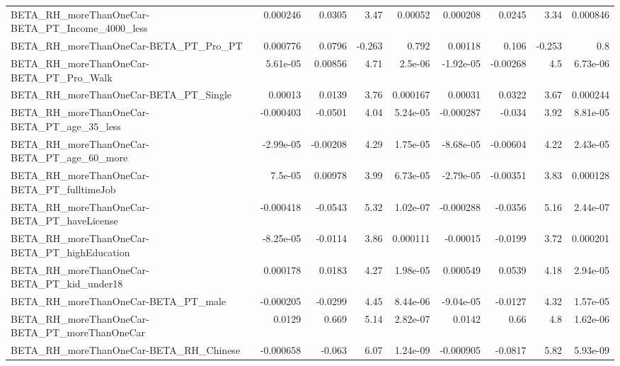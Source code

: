\begin{tabular}{lrrrrrrrr}
BETA\_RH\_moreThanOneCar-BETA\_PT\_Income\_4000\_less    &    0.000246 &       0.0305 &      3.47 &  0.00052 &   0.000208 &      0.0245 &         3.34 &      0.000846 \\
BETA\_RH\_moreThanOneCar-BETA\_PT\_Pro\_PT              &    0.000776 &       0.0796 &    -0.263 &    0.792 &    0.00118 &       0.106 &       -0.253 &           0.8 \\
BETA\_RH\_moreThanOneCar-BETA\_PT\_Pro\_Walk            &    5.61e-05 &      0.00856 &      4.71 &  2.5e-06 &  -1.92e-05 &    -0.00268 &          4.5 &      6.73e-06 \\
BETA\_RH\_moreThanOneCar-BETA\_PT\_Single              &     0.00013 &       0.0139 &      3.76 & 0.000167 &    0.00031 &      0.0322 &         3.67 &      0.000244 \\
BETA\_RH\_moreThanOneCar-BETA\_PT\_age\_35\_less         &   -0.000403 &      -0.0501 &      4.04 & 5.24e-05 &  -0.000287 &      -0.034 &         3.92 &      8.81e-05 \\
BETA\_RH\_moreThanOneCar-BETA\_PT\_age\_60\_more         &   -2.99e-05 &     -0.00208 &      4.29 & 1.75e-05 &  -8.68e-05 &    -0.00604 &         4.22 &      2.43e-05 \\
BETA\_RH\_moreThanOneCar-BETA\_PT\_fulltimeJob         &     7.5e-05 &      0.00978 &      3.99 & 6.73e-05 &  -2.79e-05 &    -0.00351 &         3.83 &      0.000128 \\
BETA\_RH\_moreThanOneCar-BETA\_PT\_haveLicense         &   -0.000418 &      -0.0543 &      5.32 & 1.02e-07 &  -0.000288 &     -0.0356 &         5.16 &      2.44e-07 \\
BETA\_RH\_moreThanOneCar-BETA\_PT\_highEducation       &   -8.25e-05 &      -0.0114 &      3.86 & 0.000111 &   -0.00015 &     -0.0199 &         3.72 &      0.000201 \\
BETA\_RH\_moreThanOneCar-BETA\_PT\_kid\_under18         &    0.000178 &       0.0183 &      4.27 & 1.98e-05 &   0.000549 &      0.0539 &         4.18 &      2.94e-05 \\
BETA\_RH\_moreThanOneCar-BETA\_PT\_male                &   -0.000205 &      -0.0299 &      4.45 & 8.44e-06 &  -9.04e-05 &     -0.0127 &         4.32 &      1.57e-05 \\
BETA\_RH\_moreThanOneCar-BETA\_PT\_moreThanOneCar      &      0.0129 &        0.669 &      5.14 & 2.82e-07 &     0.0142 &        0.66 &          4.8 &      1.62e-06 \\
BETA\_RH\_moreThanOneCar-BETA\_RH\_Chinese             &   -0.000658 &       -0.063 &      6.07 & 1.24e-09 &  -0.000905 &     -0.0817 &         5.82 &      5.93e-09 \\

\end{tabular}
